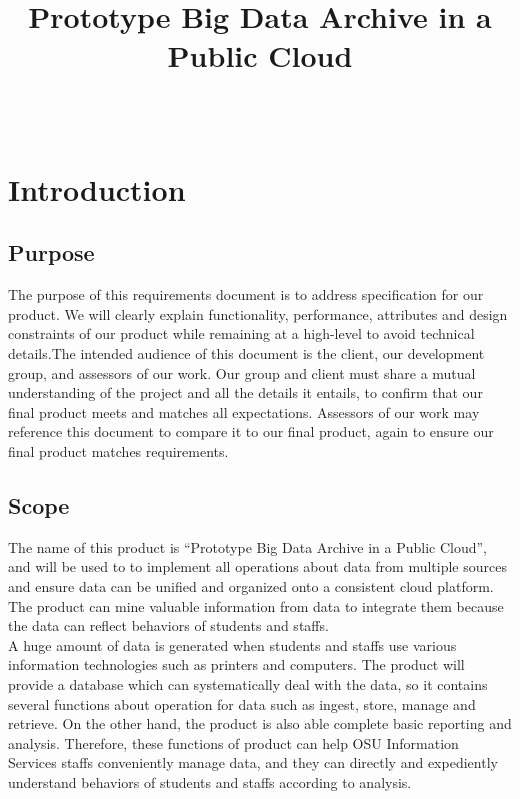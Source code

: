 \documentclass[10pt,draftclsnofoot,onecolumn,journal,compsoc]{IEEEtran}
\title{Prototype Big Data Archive in a Public Cloud}
\author{
  \IEEEauthorblockN{Group 56: Pathfinder of Big Data\\Zhi Jiang, Isaac T Chan, Zhaoheng Wang} \\
  \IEEEauthorblockA{CS 461: Senior Capstone Fall 2016 \\ Oregon State University}
}
\date{}
\begin{document}
    \maketitle
    \IEEEdisplaynontitleabstractindextext
    \IEEEpeerreviewmaketitle

    \newpage
    \tableofcontents

    \newpage
    \section{Introduction}
        \subsection{Purpose}
        The purpose of this requirements document is to address specification for our product. We will clearly explain functionality, performance, attributes and design constraints of our product while remaining at a high-level to avoid technical details.The intended audience of this document is the client, our development group, and assessors of our work. Our group and client must share a mutual understanding of the project and all the details it entails, to confirm that our final product meets and matches all expectations. Assessors of our work may reference this document to compare it to our final product, again to ensure our final product matches requirements.
        
        \subsection{Scope}
        The name of this product is “Prototype Big Data Archive in a Public Cloud”, and will be used to to implement all operations about data from multiple sources and ensure data can be unified and organized onto a consistent cloud platform. The product can mine valuable information from data to integrate them because the data can reflect behaviors of students and staffs.\\
        
        \noindent A huge amount of data is generated when students and staffs use various information technologies such as printers and computers. The product will provide a database which can systematically deal with the data, so it contains several functions about operation for data such as ingest, store, manage and retrieve. On the other hand, the product is also able complete basic reporting and analysis. Therefore, these functions of product can help OSU Information Services staffs conveniently manage data, and they can directly and expediently understand behaviors of students and staffs according to analysis.
\end{document}
